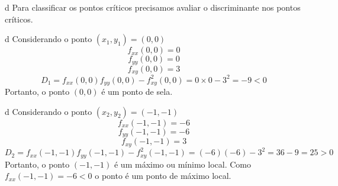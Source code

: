 \begin{resolution}{d}
  Para classificar os pontos críticos precisamos avaliar o discriminante nos
  pontos críticos.
\end{resolution}

\begin{resolution}{d}
  Considerando o ponto \((x_1, y_1) = (0, 0)\)
  \[
    f_{xx}(0, 0) = 0
  \]
  \[
    f_{yy}(0, 0) = 0
  \]
  \[
    f_{xy}(0, 0) = 3
  \]
  \[
    D_1
    = f_{xx}(0, 0)f_{yy}(0, 0) - f^2_{xy}(0, 0)
    = 0 \times 0 - 3^2
    = -9 < 0
  \]
  Portanto, o ponto $(0, 0)$ é um ponto de sela.
\end{resolution}

\begin{resolution}{d}
  Considerando o ponto \((x_2, y_2) = (-1, -1)\)
  \[
    f_{xx}(-1, -1) = -6
  \]
  \[
    f_{yy}(-1, -1) = -6
  \]
  \[
    f_{xy}(-1, -1) = 3
  \]
  \[
    D_2
    = f_{xx}(-1, -1)f_{yy}(-1, -1) - f^2_{xy}(-1, -1)
    = (-6)(-6) - 3^2
    = 36 - 9
    = 25 > 0
  \]
  Portanto, o ponto $(-1, -1)$ é um máximo ou mínimo local.
  Como \(f_{xx}(-1, -1) = -6 < 0\)
  o ponto é um ponto de máximo local.
\end{resolution}


